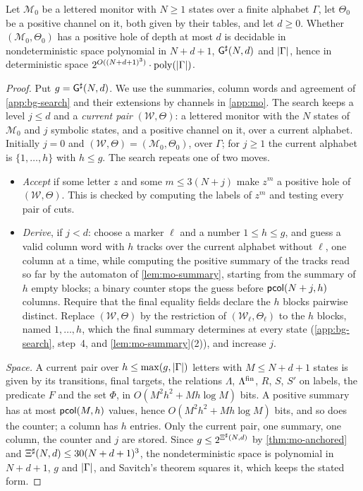 \begin{proposition}\label{prop:cx-search}
Let $\mathcal M_0$ be a lettered monitor with $N\ge1$ states over a finite
alphabet $\Gamma$, let $\Theta_0$ be a positive channel on it, both given by
their tables, and let $d\ge0$. Whether $(\mathcal M_0,\Theta_0)$ has a positive
hole of depth at most $d$ is decidable in nondeterministic space polynomial in
$N+d+1$, $\mathsf{G}^{\sharp}(N,d)$ and $\lvert \Gamma\rvert$, hence in deterministic space
$2^{O((N+d+1)^3)}\cdot\mathrm{poly}(\lvert \Gamma\rvert)$.
\end{proposition}

\begin{proof}
Put $g=\mathsf{G}^{\sharp}(N,d)$. We use the summaries, column words and agreement of
\cref{app:bg-search} and their extensions by channels in \cref{app:mo}. The
search keeps a level $j\le d$ and a \emph{current pair} $(\mathcal W,\Theta)$:
a lettered monitor with the $N$ states of $\mathcal M_0$ and $j$ symbolic
states, and a positive channel on it, over a current alphabet. Initially
$j=0$ and $(\mathcal W,\Theta)=(\mathcal M_0,\Theta_0)$, over $\Gamma$; for
$j\ge1$ the current alphabet is $\{1,\ldots,h\}$ with $h\le g$. The search
repeats one of two moves.
\begin{itemize}[leftmargin=*]
\item \emph{Accept} if some letter $z$ and some $m\le3(N+j)$ make $z^m$ a
  positive hole of $(\mathcal W,\Theta)$. This is checked by computing the
  labels of $z^m$ and testing every pair of cuts.
\item \emph{Derive}, if $j<d$: choose a marker $\ell$ and a number $1\le h\le g$,
  and guess a valid column word with $h$ tracks over the current alphabet
  without $\ell$, one column at a time, while computing the positive summary
  of the tracks read so far by the automaton of \cref{lem:mo-summary}, starting
  from the summary of $h$ empty blocks; a binary counter stops the guess before
  $\mathsf{pcol}(N+j,h)$ columns. Require that the final equality fields declare
  the $h$ blocks pairwise distinct. Replace $(\mathcal W,\Theta)$ by the
  restriction of $(\mathcal W_\ell,\Theta_\ell)$ to the $h$ blocks, named
  $1,\ldots,h$, which the final summary determines at every state
  (\cref{app:bg-search}, step~4, and \cref{lem:mo-summary}(2)), and increase
  $j$.
\end{itemize}

\emph{Space.} A current pair over $h\le\max(g,\lvert \Gamma\rvert)$ letters with
$M\le N+d+1$ states is given by its transitions, final targets, the relations
$\Lambda$, $\Lambda^{\mathrm{fin}}$, $R$, $S$, $S'$ on labels, the predicate $F$ and the set
$\Phi$, in $O(M^2h^2+Mh\log M)$ bits. A positive summary has at most
$\mathsf{pcol}(M,h)$ values, hence $O(M^2h^2+Mh\log M)$ bits, and so does the
counter; a column has $h$ entries. Only the current pair, one summary, one
column, the counter and $j$ are stored. Since $g\le2^{\Xi^{\sharp}(N,d)}$ by
\cref{thm:mo-anchored} and $\Xi^{\sharp}(N,d)\le30(N+d+1)^3$, the nondeterministic
space is polynomial in $N+d+1$, $g$ and $\lvert \Gamma\rvert$, and Savitch's theorem
squares it, which keeps the stated form.


\end{proof}

